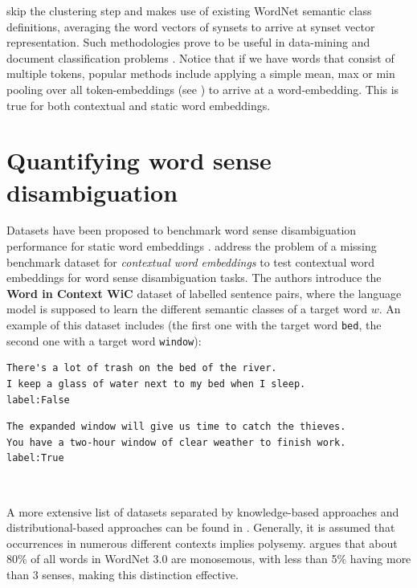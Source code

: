 \documentclass[a4paper,12pt,oneside,openright]{report}
\begin{document}
\cite{remus18} skip the clustering step and makes use of existing WordNet semantic class definitions, averaging the word vectors of synsets to arrive at synset vector representation.
Such methodologies prove to be useful in data-mining and document classification problems \cite{reimers19}.
Notice that if we have words that consist of multiple tokens, popular methods include applying a simple mean, max or min pooling over all token-embeddings (see \cite{bommasani19, akbik19, may19}) to arrive at a word-embedding. 
This is true for both contextual and static word embeddings. \\

\section{Quantifying word sense disambiguation}

Datasets have been proposed to benchmark word sense disambiguation performance for static word embeddings \cite{bruni13, hill15}.
\cite{pilehvar19} address the problem of a missing benchmark dataset for \textit{contextual word embeddings} to test contextual word embeddings for word sense disambiguation tasks.
The authors introduce the \textbf{Word in Context WiC} dataset of labelled sentence pairs, where the language model is supposed to learn the different semantic classes of a target word $w$. 
An example of this dataset includes (the first one with the target word \Verb#bed#, the second one with a target word \Verb#window#): \\

\begin{tcolorbox}
\begin{verbatim}
There's a lot of trash on the bed of the river.
I keep a glass of water next to my bed when I sleep.
label:False
\end{verbatim}
\end{tcolorbox}

\quad

\begin{tcolorbox}
\begin{verbatim}
The expanded window will give us time to catch the thieves.
You have a two-hour window of clear weather to finish work.
label:True
\end{verbatim} \\
\end{tcolorbox} 

A more extensive list of datasets separated by knowledge-based approaches and distributional-based approaches can be found in \cite{camachocollados18, liebeskind19, navigli19}.
Generally, it is assumed that occurrences in numerous different contexts implies polysemy.
\cite{camachocollados18} argues that about 80\% of all words in WordNet  3.0 are monosemous, with less than 5\% having more than 3 senses, making this distinction effective. \\
\end{document}
